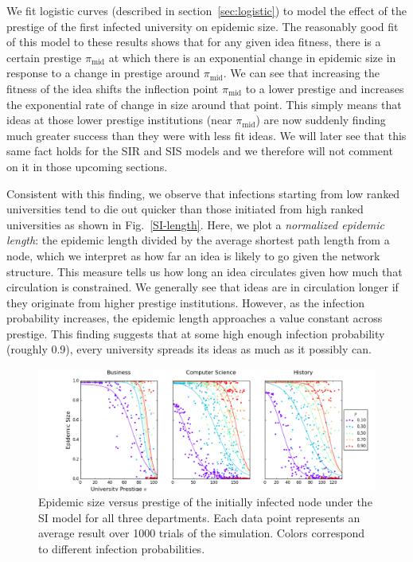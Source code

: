 \documentclass[%
 reprint,
 amsmath,amssymb,
 aps,
]{revtex4-1}
\begin{document}
We fit logistic curves (described in section~\ref{sec:logistic}) to model the effect of the prestige of the first infected university on epidemic size. The reasonably good fit of this model to these results shows that for any given idea fitness, there is a certain prestige $\pi_\text{mid}$ at which there is an exponential change in epidemic size in response to a change in prestige around $\pi_\text{mid}$. We can see that increasing the fitness of the idea shifts the inflection point $\pi_\text{mid}$ to a lower prestige and increases the exponential rate of change in size around that point. This simply means that ideas at those lower prestige institutions (near $\pi_\text{mid}$) are now suddenly finding much greater success than they were with less fit ideas. We will later see that this same fact holds for the SIR and SIS models and we therefore will not comment on it in those upcoming sections.

Consistent with this finding, we observe that infections starting from low ranked universities tend to die out quicker than those initiated from high ranked universities as shown in Fig.~\ref{SI-length}. Here, we plot a \emph{normalized epidemic length}: the epidemic length divided by the average shortest path length from a node, which we interpret as how far an idea is likely to go given the network structure. This measure tells us how long an idea circulates given how much that circulation is constrained. We generally see that ideas are in circulation longer if they originate from higher prestige institutions. However, as the infection probability increases, the epidemic length approaches a value constant across prestige. This finding suggests that at some high enough infection probability (roughly 0.9), every university spreads its ideas as much as it possibly can.

\begin{figure}
	\centering
  \includegraphics[width=\textwidth]{figures/size-results-of-ALL-SI.png}
  \caption{Epidemic size versus prestige of the initially infected node under the SI model for all three departments. Each data point represents an average result over 1000 trials of the simulation. Colors correspond to different infection probabilities.}
  \label{SI-size}
\end{figure}
\end{document}

